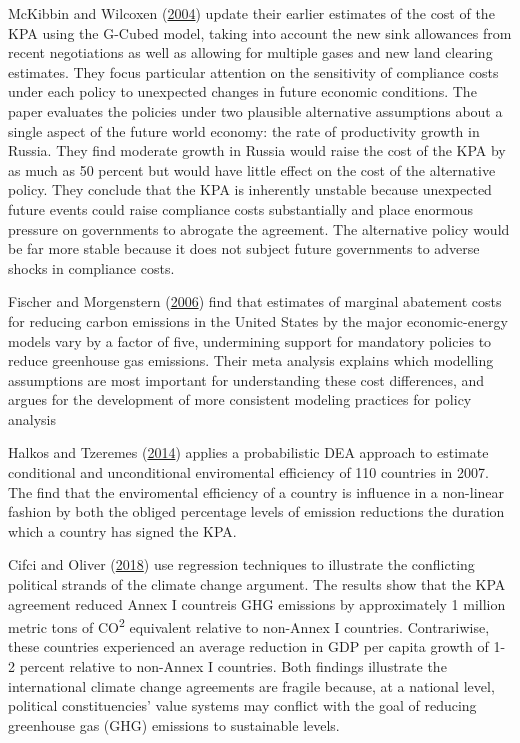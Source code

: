 \documentclass[12pt,]{article}
\begin{document}
McKibbin and Wilcoxen (\protect\hyperlink{ref-McKibbin2004}{2004}) update their earlier estimates of the cost of the KPA using the G-Cubed model, taking into account the new sink allowances from recent negotiations as well as allowing for multiple gases and new land clearing estimates. They focus particular attention on the sensitivity of compliance costs under each policy to unexpected changes in future economic conditions. The paper evaluates the policies under two plausible alternative assumptions about a single aspect of the future world economy: the rate of productivity growth in Russia. They find moderate growth in Russia would raise the cost of the KPA by as much as 50 percent but would have little effect on the cost of the alternative policy. They conclude that the KPA is inherently unstable because unexpected future events could raise compliance costs substantially and place enormous pressure on governments to abrogate the agreement. The alternative policy would be far more stable because it does not subject future governments to adverse shocks in compliance costs.

Fischer and Morgenstern (\protect\hyperlink{ref-Fischer2006}{2006}) find that estimates of marginal abatement costs for reducing carbon emissions in the United States by the major economic-energy models vary by a factor of five, undermining support for mandatory policies to reduce greenhouse gas emissions. Their meta analysis explains which modelling assumptions are most important for understanding these cost differences, and argues for the development of more consistent modeling practices for policy analysis

Halkos and Tzeremes (\protect\hyperlink{ref-Halkos2014}{2014}) applies a probabilistic DEA approach to estimate conditional and unconditional enviromental efficiency of 110 countries in 2007. The find that the enviromental efficiency of a country is influence in a non-linear fashion by both the obliged percentage levels of emission reductions the duration which a country has signed the KPA.

Cifci and Oliver (\protect\hyperlink{ref-Cifci2018}{2018}) use regression techniques to illustrate the conflicting political strands of the climate change argument. The results show that the KPA agreement reduced Annex I countreis GHG emissions by approximately 1 million metric tons of CO\textsuperscript{2} equivalent relative to non-Annex I countries. Contrariwise, these countries experienced an average reduction in GDP per capita growth of 1-2 percent relative to non-Annex I countries. Both findings illustrate the international climate change agreements are fragile because, at a national level, political constituencies' value systems may conflict with the goal of reducing greenhouse gas (GHG) emissions to sustainable levels.
\end{document}

